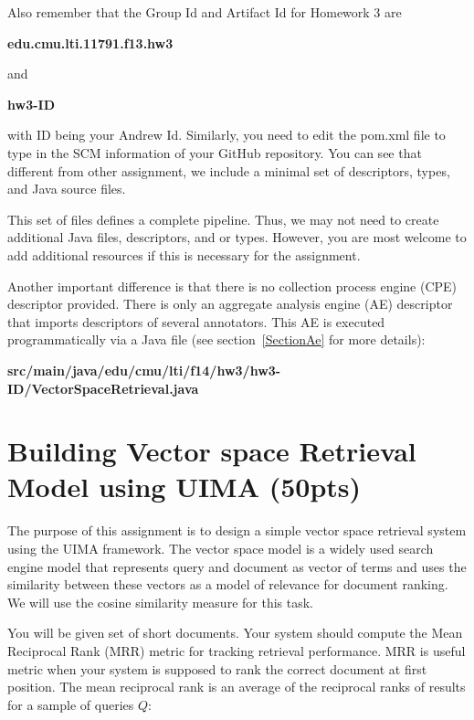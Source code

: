 \documentclass[oneside,11pt]{book}
\begin{document}
Also remember that the Group Id and Artifact Id for Homework 3 are

\begin{center}\textbf{ edu.cmu.lti.11791.f13.hw3 }\end{center}

and 

\begin{center}\textbf{hw3-ID }\end{center}
with ID being your Andrew Id.
Similarly, you need to edit the pom.xml file to type in the SCM information of
your GitHub repository. You can see that different from other assignment, 
we include a minimal set of descriptors, types, and Java source files.

This set of files defines a complete pipeline. Thus, we may not need
to create additional Java files, descriptors, and or types.
However, you are most welcome to add additional resources if this is necessary for the assignment.

Another important difference is that there is no collection process engine (CPE) descriptor provided.
There is only an aggregate analysis engine (AE) descriptor that imports descriptors of several annotators.
This AE is executed programmatically via a Java file (see section~\ref{SectionAe} for more details):

\begin{center}\textbf{src/main/java/edu/cmu/lti/f14/hw3/hw3-ID/VectorSpaceRetrieval.java} \end{center}

\chapter{Building Vector space Retrieval Model using UIMA (50pts)}

The purpose of this assignment is to design a simple vector space retrieval system using the UIMA
framework. 
The vector space model is a widely used search engine model that represents query and
document as vector of terms and uses the similarity between these vectors as a model of relevance for
document ranking. 
We will use the cosine similarity measure for this task. 

You will be given set of short documents. Your system should compute the Mean Reciprocal Rank
(MRR) metric for tracking retrieval performance. MRR is useful metric when your system is supposed
to rank the correct document at first position. The mean reciprocal rank is an average of the reciprocal
ranks of results for a sample of queries $Q$:
\end{document}
